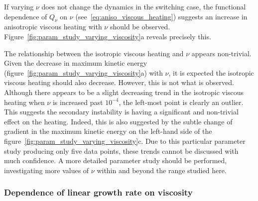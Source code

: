 If varying $\nu$ does not change the dynamics in the switching case, the functional dependence of $Q_{\nu}$ on $\nu$ (see~\eqref{eq:aniso_viscous_heating}) suggests an increase in anisotropic viscous heating with $\nu$ should be observed. Figure~\ref{fig:param_study_varying_viscosity}a reveals precisely this.

The relationship between the isotropic viscous heating and $\nu$ appears non-trivial. Given the decrease in maximum kinetic energy (figure~\ref{fig:param_study_varying_viscosity}a) with $\nu$, it is expected the isotropic viscous heating should also decrease. However, this is not what is observed. Although there appears to be a slight decreasing trend in the isotropic viscous heating when $\nu$ is increased past $10^{-4}$, the left-most point is clearly an outlier. This suggests the secondary instability is having a significant and non-trivial effect on the heating. Indeed, this is also suggested by the subtle change of gradient in the maximum kinetic energy on the left-hand side of the figure~\ref{fig:param_study_varying_viscosity}c. Due to this particular parameter study producing only five data points, these trends cannot be discussed with much confidence. A more detailed parameter study should be performed, investigating more values of $\nu$ within and beyond the range studied here.

\subsubsection{Dependence of linear growth rate on viscosity}
\label{sec:linear_growth_rate_varying_visc}


